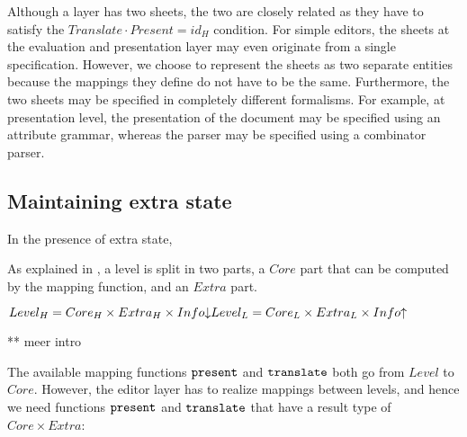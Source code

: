 Although a layer has two sheets, the two are closely related as they have to satisfy the
$Translate \cdot Present = id_{H}$ condition. For simple editors, the sheets at the evaluation and presentation layer may even originate from a single specification. However, we choose to represent the sheets as two separate entities because the mappings they define do not have to be the same.  Furthermore, the two sheets may be specified in completely different formalisms. For example, at presentation level, the presentation of the document may be specified using an attribute grammar, whereas the parser may be specified using a combinator parser\cite{combinatorparser}.


%																
%																
%																
\subsection{Maintaining extra state} \label{sect:maintainingExtraState}

In the presence of extra state,  \label{sect:extraState}

As explained in \label{sect:oneLevelDoubleES}, a level is split in two parts, a $Core$ part that can be computed by the mapping function, and an $Extra$ part.


\begin{small}\begin{math} \label{inv:extraState}
Level_{H} = Core_{H} \times Extra_{H} \times Info\idwn\\
Level_{L} = Core_{L} \times Extra_{L} \times Info\iup\\
\end{math}\end{small}

 ** meer intro

The available mapping functions ${\tt present}$ and ${\tt translate}$ both go from $Level$ to $Core$. However, the editor layer has to realize mappings between levels, and hence we need functions ${\tt present}$ and ${\tt translate}$ that have a result type of $Core \times Extra$:

